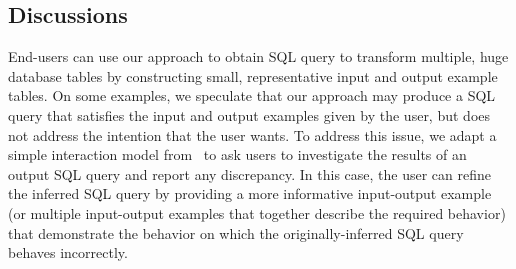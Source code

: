 







\subsection{Discussions}
\label{sec:uim}



End-users can use our approach to obtain SQL query to transform
multiple, huge database tables by constructing small, representative
input and output example tables. On some examples, we speculate
that our approach
may produce a SQL query that satisfies the input and output examples
given by the user, but does not address the intention
that the user wants. To address this issue, we adapt a simple
interaction model from~\cite{Harris:2011} to ask users to investigate the results of
an output SQL query and report any discrepancy. In this case,
the user can refine the inferred SQL query by providing a more
informative input-output example (or multiple input-output examples
that together describe the required behavior) that demonstrate the behavior on
which the originally-inferred SQL query behaves incorrectly.




